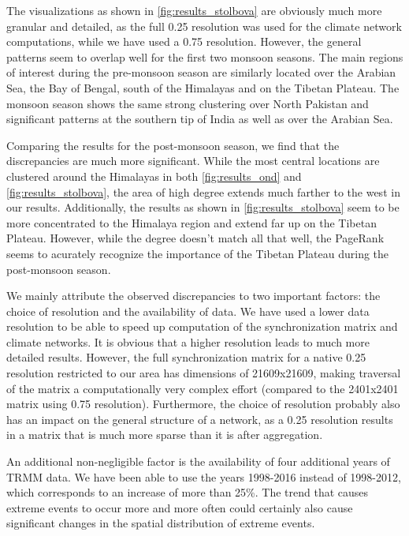 The visualizations as shown in \cref{fig:results_stolbova} are obviously much more granular and detailed, as the full {0.25\degree} resolution was used for the climate network computations, while we have used a {0.75\degree} resolution. However, the general patterns seem to overlap well for the first two monsoon seasons. The main regions of interest during the pre-monsoon season are similarly located over the Arabian Sea, the Bay of Bengal, south of the Himalayas and on the Tibetan Plateau. The monsoon season shows the same strong clustering over North Pakistan and significant patterns at the southern tip of India as well as over the Arabian Sea.

Comparing the results for the post-monsoon season, we find that the discrepancies are much more significant. While the most central locations are clustered around the Himalayas in both \cref{fig:results_ond} and \cref{fig:results_stolbova}, the area of high degree extends much farther to the west in our results. Additionally, the results as shown in \cref{fig:results_stolbova} seem to be more concentrated to the Himalaya region and extend far up on the Tibetan Plateau. However, while the degree doesn't match all that well, the PageRank seems to acurately recognize the importance of the Tibetan Plateau during the post-monsoon season.

We mainly attribute the observed discrepancies to two important factors: the choice of resolution and the availability of data. We have used a lower data resolution to be able to speed up computation of the synchronization matrix and climate networks. It is obvious that a higher resolution leads to much more detailed results. However, the full synchronization matrix for a native {0.25\degree} resolution restricted to our area has dimensions of 21609x21609, making traversal of the matrix a computationally very complex effort (compared to the 2401x2401 matrix using {0.75\degree} resolution). Furthermore, the choice of resolution probably also has an impact on the general structure of a network, as a {0.25\degree} resolution results in a matrix that is much more sparse than it is after aggregation.

An additional non-negligible factor is the availability of four additional years of TRMM data. We have been able to use the years 1998-2016 instead of 1998-2012, which corresponds to an increase of more than 25\%. The trend that causes extreme events to occur more and more often could certainly also cause significant changes in the spatial distribution of extreme events.

